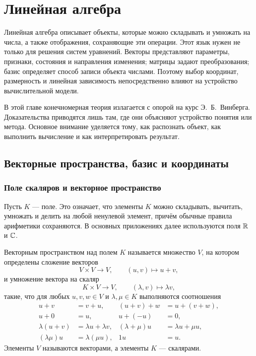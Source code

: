 \chapter{Линейная алгебра}
\label{chap:linear-algebra}

Линейная алгебра описывает объекты, которые можно складывать и умножать на числа, а также отображения, сохраняющие эти операции. Этот язык нужен не только для решения систем уравнений. Векторы представляют параметры, признаки, состояния и направления изменения; матрицы задают преобразования; базис определяет способ записи объекта числами. Поэтому выбор координат, размерность и линейная зависимость непосредственно влияют на устройство вычислительной модели.

В этой главе конечномерная теория излагается с опорой на курс Э.~Б.~Винберга. Доказательства приводятся лишь там, где они объясняют устройство понятия или метода. Основное внимание уделяется тому, как распознать объект, как выполнить вычисление и как интерпретировать результат.

\section{Векторные пространства, базис и координаты}
\label{sec:vector-spaces-bases}

\subsection{Поле скаляров и векторное пространство}

Пусть \(K\) --- поле. Это означает, что элементы \(K\) можно складывать, вычитать, умножать и делить на любой ненулевой элемент, причём обычные правила арифметики сохраняются. В основных приложениях далее используются поля \(\mathbb{R}\) и \(\mathbb{C}\).

\begin{definition}
Векторным пространством над полем \(K\) называется множество \(V\), на котором определены сложение векторов
\[
V\times V\to V,
\qquad
(u,v)\mapsto u+v,
\]
и умножение вектора на скаляр
\[
K\times V\to V,
\qquad
(\lambda,v)\mapsto \lambda v,
\]
такие, что для любых \(u,v,w\in V\) и \(\lambda,\mu\in K\) выполняются соотношения
\[
\begin{aligned}
u+v&=v+u,
&
(u+v)+w&=u+(v+w),
\\
u+0&=u,
&
u+(-u)&=0,
\\
\lambda(u+v)&=\lambda u+\lambda v,
&
(\lambda+\mu)u&=\lambda u+\mu u,
\\
(\lambda\mu)u&=\lambda(\mu u),
&
1u&=u.
\end{aligned}
\]
Элементы \(V\) называются векторами, а элементы \(K\) --- скалярами.
\end{definition}

